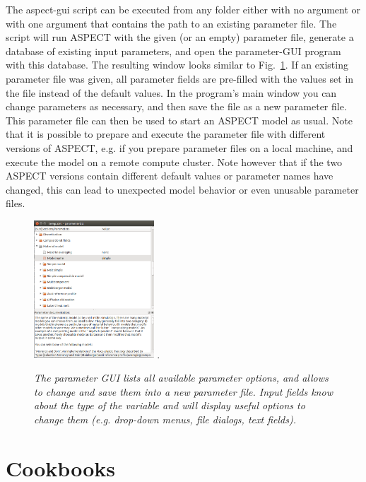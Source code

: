 \documentclass{article}
\newcommand{\aspect}{\textsc{ASPECT}}
\begin{document}
The aspect-gui script can be executed from any folder either with no argument or with one argument that contains the path to
an existing parameter file. The script will run \aspect{} with the given (or an empty) parameter file, generate a database
of existing input parameters, and open the parameter-GUI program with this database. The resulting window looks similar to Fig.~\ref{fig:aspect-gui}. If an existing parameter file was
given, all parameter fields are pre-filled with the values set in the file instead of the default values.
In the program's main window you can change parameters as necessary, and then save the file as a new parameter file. This parameter file can then be used
to start an \aspect{} model as usual. Note that it is possible to prepare and execute the parameter file with different versions of \aspect{}, e.g. if you prepare parameter files on a local machine, and execute the model on a remote compute cluster.
Note however that if the two \aspect{} versions contain different default values or parameter names have changed, this can lead
to unexpected model behavior or even unusable parameter files.

\begin{figure}
\hfill
\includegraphics[width=0.4\textwidth]{aspect-gui.png}
\hfill
\phantom.
\caption{\it The parameter GUI lists all available parameter options, and allows to change and save them into a new parameter file. Input fields know about the type of the variable and will display useful options to change them (e.g. drop-down menus, file dialogs, text fields).}
\label{fig:aspect-gui}
\end{figure}

\section{Cookbooks}
\label{sec:cookbooks}
\end{document}
